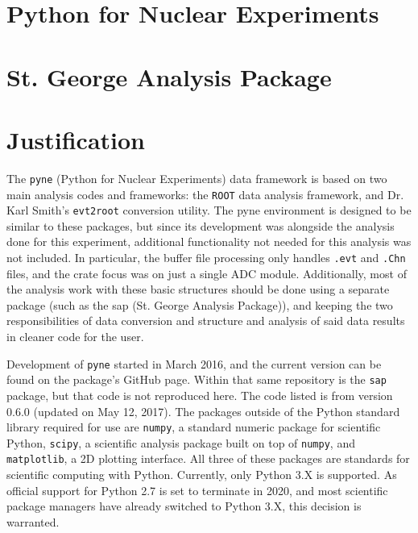 \section{Python for Nuclear Experiments}


\section{St. George Analysis Package}


\section{Justification}

The \texttt{pyne} (Python for Nuclear Experiments) data framework is
based on two main analysis codes and frameworks: the \texttt{ROOT} data
analysis framework, and Dr. Karl Smith's \texttt{evt2root} conversion
utility. The pyne environment is designed to be similar to these
packages, but since its development was alongside the analysis done for
this experiment, additional functionality not needed for this analysis
was not included. In particular, the buffer file processing only handles
\texttt{.evt} and \texttt{.Chn} files, and the crate focus was on just a
single ADC module. Additionally, most of the analysis work with these
basic structures should be done using a separate package (such as the
sap (St. George Analysis Package)), and keeping the two responsibilities
of data conversion and structure and analysis of said data results in
cleaner code for the user.

Development of \texttt{pyne} started in March 2016, and the current
version can be found on the package's GitHub page. Within that same
repository is the \texttt{sap} package, but that code is not reproduced
here. The code listed is from version 0.6.0 (updated on May 12, 2017).
The packages outside of the Python standard library required for use are
\texttt{numpy}, a standard numeric package for scientific Python,
\texttt{scipy}, a scientific analysis package built on top of
\texttt{numpy}, and \texttt{matplotlib}, a 2D plotting interface. All
three of these packages are standards for scientific computing with
Python. Currently, only Python 3.X is supported. As official support for
Python 2.7 is set to terminate in 2020, and most scientific package
managers have already switched to Python 3.X, this decision is
warranted.
